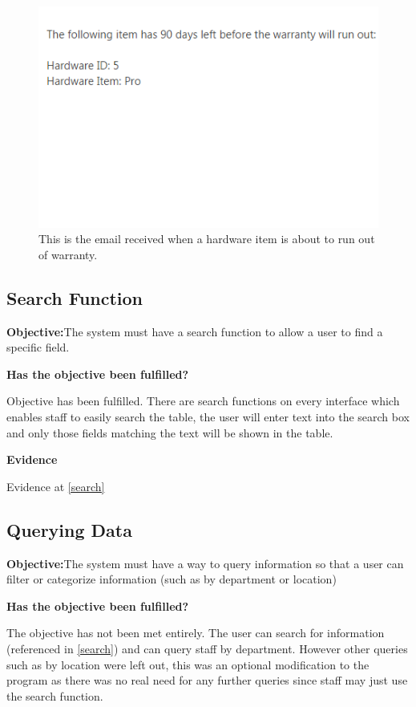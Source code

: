 \begin{figure}[H]
    \includegraphics[width=\textwidth]{./Testing/Images/EmailExpiredHardware.png}
    \caption{This is the email received when a hardware item is about to run out of warranty.} 
\end{figure}



\subsection{Search Function}

\textbf{Objective:}The system must have a search function to allow a user to find a specific field.

\textbf{Has the objective been fulfilled?}

Objective has been fulfilled. There are search functions on every interface which enables staff to easily search the table, the user will enter text into the search box and only those fields matching the text will be shown in the table.

\textbf{Evidence}

Evidence at \ref{search}


\subsection{Querying Data}

\textbf{Objective:}The system must have a way to query information so that a user can filter or categorize information (such as by department or location)

\textbf{Has the objective been fulfilled?}

The objective has not been met entirely. The user can search for information (referenced in \ref{search}) and can query staff by department. However other queries such as by location were left out, this was an optional modification to the program as there was no real need for any further queries since staff may just use the search function.

